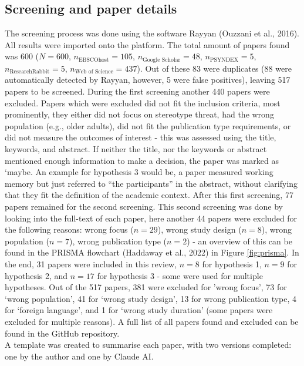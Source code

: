 \documentclass[
  stu,floatsintext]{apa7}
\begin{document}
\subsection{Screening and paper details}\label{screening-and-paper-details}

The screening process was done using the software Rayyan (Ouzzani et al., 2016). All results were imported onto the platform.
The total amount of papers found was 600 (\(N = 600\), \(n_{\text{EBSCOhost}} = 105\), \(n_{\text{Google Scholar}} = 48\), \(n_{\text{PSYNDEX}} = 5\), \(n_{\text{ResearchRabbit}} = 5\), \(n_{\text{Web of Science}} = 437\)). Out of these 83 were duplicates (88 were automatically detected by Rayyan, however, 5 were false positives), leaving 517 papers to be screened. During the first screening another 440 papers were excluded.
Papers which were excluded did not fit the inclusion criteria, most prominently, they either did not focus on stereotype threat, had the wrong population (e.g., older adults), did not fit the publication type requirements, or did not measure the outcomes of interest - this was assessed using the title, keywords, and abstract. If neither the title, nor the keywords or abstract mentioned enough information to make a decision, the paper was marked as `maybe.
An example for hypothesis 3 would be, a paper measured working memory but just referred to ``the participants'' in the abstract, without clarifying that they fit the definition of the academic context. After this first screening, 77 papers remained for the second screening.
This second screening was done by looking into the full-text of each paper, here another 44 papers were excluded for the following reasons: wrong focus (\(n = 29\)), wrong study design (\(n = 8\)), wrong population (\(n = 7\)), wrong publication type (\(n = 2\)) - an overview of this can be found in the PRISMA flowchart (Haddaway et al., 2022) in Figure \ref{fig:prisma}.
In the end, 31 papers were included in this review, \(n = 8\) for hypothesis 1, \(n = 9\) for hypothesis 2, and \(n = 17\) for hypothesis 3 - some were used for multiple hypotheses. Out of the 517 papers, 381 were excluded for 'wrong focus', 73 for `wrong population', 41 for `wrong study design', 13 for wrong publication type, 4 for `foreign language', and 1 for `wrong study duration' (some papers were excluded for multiple reasons). A full list of all papers found and excluded can be found in the GitHub repository.\\
A template was created to summarise each paper, with two versions completed: one by the author and one by Claude AI.
\end{document}
